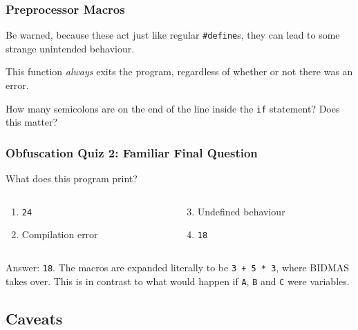 \documentclass[handout,xcolor]{beamer}
\begin{document}
\begin{frame}
	\frametitle{Preprocessor Macros}
	\pause
	
	\small
	Be warned, because these act just like regular \texttt{\#define}s, they can lead to some strange unintended behaviour.
	\pause
	
	This function \textit{always} exits the program, regardless of whether or not there was an error.
	\pause
	
	
	\pause
	
	How many semicolons are on the end of the line inside the \texttt{if} statement? Does this matter?
\end{frame}

\begin{frame}
	\frametitle{Obfuscation Quiz 2: Familiar Final Question}
	\pause
	
	What does this program print?
	
	
	\pause
	
	\begin{columns}
		\begin{column}{0.45\textwidth}
			\begin{enumerate}
				\item \texttt{24}
				\pause
				\item Compilation error
			\end{enumerate}
		\end{column}
		\pause
		\begin{column}{0.45\textwidth}
			\begin{enumerate}
				\setcounter{enumi}{2}
				\item Undefined behaviour
				\pause
				\item \texttt{18}
			\end{enumerate}
		\end{column}
	\end{columns}
	\pause
	
	\vspace{0.5cm}
	
	Answer: \texttt{18}. \pause The macros are expanded literally to be \texttt{3 + 5 * 3}, where BIDMAS takes over. \pause This is in contrast to what would happen if \texttt{A}, \texttt{B} and \texttt{C} were variables.
\end{frame}

\subsection{Caveats}
\end{document}
